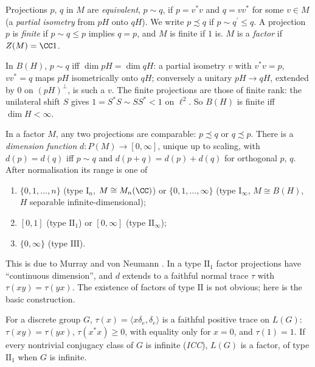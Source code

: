 \begin{definition}\label{operator-algebras:definition-murray-von-neumann}
Projections $p$, $q$ in $M$ are \emph{equivalent}, $p \sim q$, if $p = v^*v$ and $q = vv^*$ for some $v \in M$ (a \emph{partial isometry} from $pH$ onto $qH$). We write $p \precsim q$ if $p \sim q^{\prime} \leq q$. A projection
$p$ is \emph{finite} if $p \sim q \leq p$ implies $q = p$, and $M$ is finite if $1$ is. $M$ is a \emph{factor} if $Z(M) = \CC1$.
\end{definition}

\begin{example}\label{operator-algebras:example-equivalence-bh}
In $B(H)$, $p \sim q$ iff $\dim pH = \dim qH$: a partial isometry $v$ with $v^*v = p$, $vv^* = q$ maps $pH$ isometrically onto $qH$; conversely a unitary $pH \to qH$, extended by $0$ on $(pH)^\perp$, is such a $v$. The finite
projections are those of finite rank: the unilateral shift $S$ gives $1 = S^*S \sim SS^* < 1$ on $\ell^2$. So $B(H)$ is finite iff $\dim H < \infty$.
\end{example}

\begin{theorem}\label{operator-algebras:theorem-types}
In a factor $M$, any two projections are comparable: $p \precsim q$ or $q \precsim p$. There is a \emph{dimension function} $d \colon P(M) \to [0, \infty]$, unique up to scaling, with $d(p) = d(q)$ iff $p \sim q$ and
$d(p + q) = d(p) + d(q)$ for orthogonal $p$, $q$. After normalisation its range is one of
\begin{enumerate}
\item $\{0, 1, \ldots, n\}$ (type $\mathrm{I}_n$, $M \cong M_n(\CC)$) or $\{0, 1, \ldots, \infty\}$ (type $\mathrm{I}_\infty$, $M \cong B(H)$, $H$ separable infinite-dimensional);
\item $[0, 1]$ (type $\mathrm{II}_1$) or $[0, \infty]$ (type $\mathrm{II}_\infty$);
\item $\{0, \infty\}$ (type $\mathrm{III}$).
\end{enumerate}
\end{theorem}

This is due to Murray and von Neumann \cite{murray-von-neumann-1936}. In a type $\mathrm{II}_1$ factor projections have ``continuous dimension'', and $d$ extends to a faithful normal trace $\tau$ with $\tau(xy) = \tau(yx)$. The
existence of factors of type $\mathrm{II}$ is not obvious; here is the basic construction.

\begin{proposition}\label{operator-algebras:proposition-group-trace}
For a discrete group $G$, $\tau(x) = \langle x\delta_e, \delta_e\rangle$ is a faithful positive trace on $L(G)$: $\tau(xy) = \tau(yx)$, $\tau(x^*x) \geq 0$, with equality only for $x = 0$, and $\tau(1) = 1$. If every nontrivial conjugacy
class of $G$ is infinite (\emph{ICC}), $L(G)$ is a factor, of type $\mathrm{II}_1$ when $G$ is infinite.
\end{proposition}

